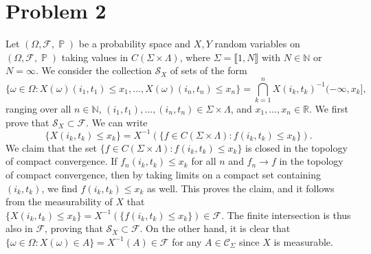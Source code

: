 \documentclass[12pt]{article}
\DeclareMathOperator{\pr}{\mathbb{P}}
\begin{document}
		
	\section*{Problem 2}
	
		Let $(\Omega,\mathcal{F},\pr)$ be a probability space and $X,Y$ random variables on $(\Omega,\mathcal{F},\pr)$ taking values in $C(\Sigma\times\Lambda)$, where $\Sigma = \llbracket 1, N\rrbracket$ with $N\in\mathbb{N}$ or $N=\infty$. We consider the collection $\mathcal{S}_X$ of sets of the form
		\[
		\{\omega\in\Omega : X(\omega)(i_1,t_1)\leq x_1,\dots,X(\omega)(i_n,t_n)\leq x_n\} = \bigcap_{k=1}^n X(i_k,t_k)^{-1}(-\infty,x_k],
		\] 
		ranging over all $n\in\mathbb{N}$, $(i_1,t_1),\dots,(i_n,t_n)\in \Sigma\times\Lambda$, and $x_1,\dots,x_n\in\mathbb{R}$. We first prove that $\mathcal{S}_X \subset \mathcal{F}$. We can write 
		\[
		\{X(i_k,t_k)\leq x_k\} = X^{-1}(\{f\in C(\Sigma\times\Lambda):f(i_k,t_k)\leq x_k\}).
		\]
		We claim that the set $\{f\in C(\Sigma\times\Lambda):f(i_k,t_k)\leq x_k\}$ is closed in the topology of compact convergence. If $f_n(i_k,t_k)\leq x_k$ for all $n$ and $f_n\to f$ in the topology of compact convergence, then by taking limits on a compact set containing $(i_k,t_k)$, we find $f(i_k,t_k)\leq x_k$ as well. This proves the claim, and it follows from the measurability of $X$ that $\{X(i_k,t_k)\leq x_k\} = X^{-1}(\{f(i_k,t_k)\leq x_k\})\in\mathcal{F}$. The finite intersection is thus also in $\mathcal{F}$, proving that $\mathcal{S}_X \subset \mathcal{F}$. On the other hand, it is clear that $\{\omega\in\Omega:X(\omega)\in A\} = X^{-1}(A)\in\mathcal{F}$ for any $A\in\mathcal{C}_\Sigma$ since $X$ is measurable.
		
\end{document}

